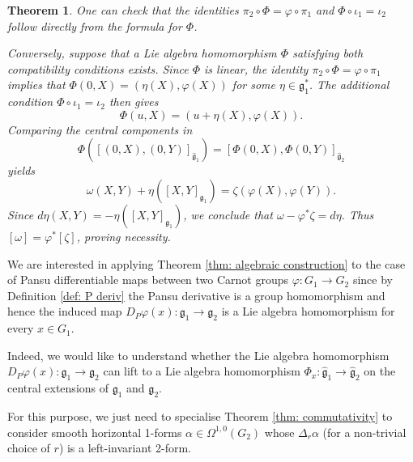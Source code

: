 \documentclass[dvipsnames]{amsart}
\newtheorem{theorem}{Theorem}[section]
\theoremstyle{definition}
\theoremstyle{definition}
\numberwithin{equation}{section}
\begin{document}
\begin{theorem}
        One can check that the identities
$\pi_2\circ\Phi=\varphi\circ\pi_1$ and
$\Phi\circ\iota_1=\iota_2$
follow directly from the formula for $\Phi$.

Conversely, suppose that a Lie algebra homomorphism $\Phi$
satisfying both compatibility conditions exists.
Since $\Phi$ is linear, the identity
$\pi_2\circ\Phi=\varphi\circ\pi_1$ implies that
$\Phi(0,X)=(\eta(X),\varphi(X))$
for some $\eta\in\mathfrak g_1^*$.
The additional condition $\Phi\circ\iota_1=\iota_2$
then gives
\[
    \Phi(u,X)=(u+\eta(X),\varphi(X)).
\]
Comparing the central components in
\[
    \Phi([(0,X),(0,Y)]_{\hat{\mathfrak g}_1})
    =
    [\Phi(0,X),\Phi(0,Y)]_{\hat{\mathfrak g}_2}
\]
yields
\[
    \omega(X,Y)+\eta([X,Y]_{\mathfrak g_1})
    =
    \zeta(\varphi(X),\varphi(Y)).
\]
Since $d\eta(X,Y)=-\eta([X,Y]_{\mathfrak g_1})$,
we conclude that
$\omega-\varphi^*\zeta=d\eta$.
Thus $[\omega]=\varphi^*[\zeta]$, proving necessity.
\end{theorem}

We are interested in applying Theorem \ref{thm: algebraic construction} to the case of Pansu differentiable maps between two Carnot groups $\varphi\colon G_1\to G_2$ since by Definition \ref{def: P deriv} the Pansu derivative is a group homomorphism and hence the induced map $D_P\varphi(x)\colon\mathfrak{g}_1\to\mathfrak{g}_2$ is a Lie algebra homomorphism for every $x\in G_1$. 

Indeed, we would like to understand whether the Lie algebra homomorphism $D_P\varphi(x)\colon\mathfrak{g}_1\to\mathfrak{g}_2$ can lift to a Lie algebra homomorphism $\Phi_x\colon\hat{\mathfrak{g}}_1\to\hat{\mathfrak{g}}_2$ on the central extensions of $\mathfrak{g}_1$ and $\mathfrak{g}_2$. 

For this purpose, we just need to specialise Theorem \ref{thm: commutativity} to consider smooth horizontal 1-forms $\alpha\in\Omega^{1,0}(G_2)$ whose $\Delta_r\alpha$ (for a non-trivial choice of $r$) is a left-invariant 2-form.
\end{document}
